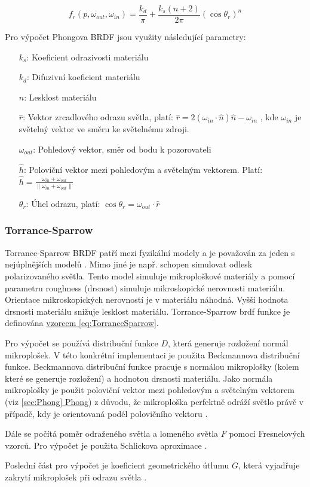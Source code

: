 \documentclass[czech,master,dept460,male,cpp,cpdeclaration]{diploma}
\newcommand{\uvec}[1]{\hat{#1}}
\begin{document}
\begin{equation} \label{eq:phongPhysicalBRDF}
    f_r\left(p,\omega_{out},\omega_{in}\right) = \frac{k_d}{\pi} +
    \frac{k_s\left(n+2\right)}{2\pi}\left(\cos\theta_r\right)^n
\end{equation}

Pro výpočet Phongova BRDF jsou využity následující parametry: 
\begin{itemize}
    \item[$k_s$:] Koeficient odrazivosti materiálu
    \item[$k_d$:] Difuzivní koeficient materiálu
    \item[$n$:] Lesklost materiálu
    \item[$\uvec{r}$:] Vektor zrcadlového odrazu světla, platí: $\uvec{r} = 2\left(\omega_{in}\cdot\uvec{n}\right)\uvec{n}-\omega_{in}$ , kde $\omega_{in}$ je světelný vektor ve směru ke světelnému zdroji.  
    \item[$\omega_{out}$:] Pohledový vektor, směr od bodu k pozorovateli
    \item[$\uvec{h}$:] Poloviční vektor mezi pohledovým a světelným vektorem. Platí: $\uvec{h} = \frac{\omega_{in} + \omega_{out}}{\| \omega_{in} + \omega_{out}\|}$
    \item[$\theta_r$:] Úhel odrazu, platí: $\cos\theta_r = \omega_{out}\cdot\uvec{r}$
\end{itemize}

\subsubsection{Torrance-Sparrow}
Torrance-Sparrow BRDF patří mezi fyzikální modely a je považován za jeden s nejúplnějších modelů \cite{BRDFOverview}. Mimo jiné je např. schopen simulovat odlesk polarizovaného světla. Tento model simuluje mikroploškové materiály a pomocí parametru roughness (drsnost) simuluje mikroskopické nerovnosti materiálu. Orientace mikroskopických nerovností je v materiálu náhodná. Vyšší hodnota drsnosti materiálu snižuje lesklost materiálu. Torrance-Sparrow brdf funkce je definována \hyperref[eq:TorranceSparrow]{vzorcem \ref{eq:TorranceSparrow}}. \par 
Pro výpočet se používá distribuční funkce $D$, která generuje rozložení normál mikroplošek. V této konkrétní implementaci je použita Beckmannova distribuční funkce. Beckmannova distribuční funkce pracuje s normálou mikroplošky (kolem které se generuje rozložení) a hodnotou drsnosti materiálu. Jako normála mikroplošky je použit poloviční vektor mezi pohledovým a světelným vektorem (viz \hyperref[sec:Phong]{\ref{sec:Phong} Phong}) z důvodu, že mikroploška perfektně odráží světlo právě v případě, kdy je orientovaná podél polovičního vektoru \cite{PHARR2017507}. \par
Dále se počítá poměr odraženého světla a lomeného světla $F$ pomocí Fresnelových vzorců. Pro výpočet je použita Schlickova aproximace \cite{SchlickFresnel}. \par
Poslední část pro výpočet je koeficient geometrického útlumu $G$, která vyjadřuje zakrytí mikroplošek při odrazu světla \cite{BRDFOverview}.
\end{document}
